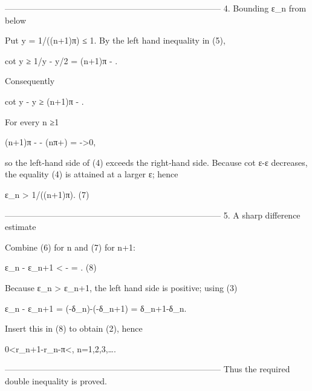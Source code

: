 -----------------------------------------------------------------------------
4.  Bounding ε_n from below  

Put y = 1/((n+1)π) ≤ 1.  
By the left hand inequality in (5),

cot y ≥ 1/y - y/2 = (n+1)π - .

Consequently

cot y - y ≥ (n+1)π - .

For every n ≥1

(n+1)π -  - \Bigl(nπ+\Bigr)
    = ->0,

so the left‐hand side of (4) exceeds the right‐hand side.
Because cot ε-ε decreases, the equality (4) is attained at a larger ε; hence  

ε_n > 1/((n+1)π).                                                   (7)

-----------------------------------------------------------------------------
5.  A sharp difference estimate

Combine (6) for n and (7) for n+1:

ε_n - ε_{n+1}  <   - 
               =  .                             (8)

Because ε_n > ε_{n+1}, the left hand side is positive; using (3)

ε_n - ε_{n+1} = \bigl(-δ_n\bigr)-\bigl(-δ_{n+1}\bigr)
               = δ_{n+1}-δ_n.

Insert this in (8) to obtain (2), hence

0<r_{n+1}-r_n-π<, \qquad n=1,2,3,\dots .

-----------------------------------------------------------------------------
Thus the required double inequality is proved.